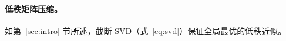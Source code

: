\documentclass[11pt]{article}
\begin{document}
\begin{mainpart}
\paragraph{低秩矩阵压缩。}
如第~\ref{sec:intro} 节所述，截断 SVD（式~\ref{eq:svd}）保证全局最优的低秩近似。



\end{mainpart}
\end{document}

